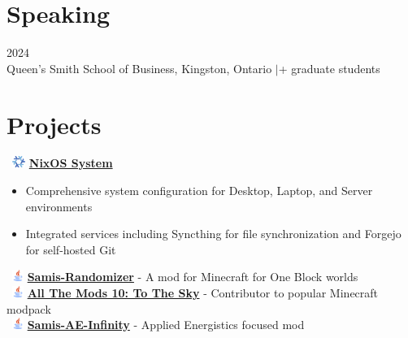 \documentclass[letterpaper,10pt]{article}
\newenvironment{resumeitemize}{
  \begin{itemize}[leftmargin=0.5in, itemsep=-1pt, topsep=1pt, labelsep=0.035in]
}{
  \end{itemize}
}
\newcommand{\sectionspace}{\vspace{2pt}}
\newcommand{\afterspacespace}{\vspace{1pt}}
\begin{document}
\section{Speaking}

\hspace{0.15in}{\bfseries Guest Lecturer on AI and Synthetic Data Generation for MMA Program} \hfill {\small 2024} \\
\hspace{0.15in}Queen's Smith School of Business, Kingston, Ontario \enspace$|$+ graduate students

\sectionspace

\section{Projects}

\hspace{0.15in}\faGithub~\includegraphics[height=1em]{assets/nix.png} \href{https://github.com/y0usaf/nixos}{\bfseries NixOS System}
\afterspacespace
\begin{resumeitemize}
\item Comprehensive system configuration for Desktop, Laptop, and Server environments
\item Integrated services including Syncthing for file synchronization and Forgejo for self-hosted Git
\end{resumeitemize}
\sectionspace

\hspace{0.15in}\faGithub~\includegraphics[height=1em]{assets/java.png} \href{https://github.com/y0usaf/Samis-Randomizer}{\bfseries Samis-Randomizer} - A mod for Minecraft for One Block worlds \\
\hspace{0.15in}\faGithub~\includegraphics[height=1em]{assets/java.png} \href{https://github.com/y0usaf/All-the-mods-10-Sky}{\bfseries All The Mods 10: To The Sky} - Contributor to popular Minecraft modpack \\
\hspace{0.15in}\faGithub~\includegraphics[height=1em]{assets/java.png} \href{https://github.com/y0usaf/Samis-AE-Infinity}{\bfseries Samis-AE-Infinity} - Applied Energistics focused mod
\sectionspace
\end{document}
